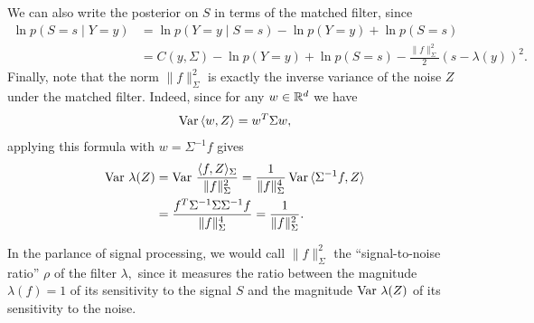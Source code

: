 We can also write the posterior on $S$ in terms of the matched filter, since
\begin{align}
	\ln p(S = s \mid Y = y)
	 & = \ln p(Y = y \mid S = s) - \ln p(Y = y) + \ln p(S = s) \nonumber \\
	& = C(y, \Sigma) - \ln p(Y = y) + \ln p(S = s) - \frac {\lVert f \rVert^2_\Sigma} 2 \left( s - \lambda(y) \right)^2.
\end{align}
Finally, note that the norm $\lVert f \rVert^2_\Sigma$ is exactly the inverse variance of the noise $Z$ under the matched filter. Indeed, since for any $w \in \mathbb{R}^d$ we have
$$
\operatorname{Var} \, \langle w, Z \rangle = w^T \Sigma w,
$$
applying this formula with $w = \Sigma^{-1} f$ gives
\begin{align*}
\operatorname{Var}\, \lambda(Z) & = \operatorname{Var} \, \frac{\langle f, Z \rangle_\Sigma}{\lVert f \rVert^2_\Sigma}  = \frac{1}{\lVert f \rVert_\Sigma^4} \operatorname{Var} \, \langle \Sigma^{-1} f, Z \rangle \\
& = \frac{f^T \Sigma^{-1} \Sigma \Sigma^{-1} f}{\lVert f \rVert_\Sigma^4} = \frac{1}{\lVert f \rVert^2_\Sigma}.
\end{align*}

In the parlance of signal processing, we would call $\lVert f \rVert^2_\Sigma$ the ``signal-to-noise ratio'' $\rho$ of the filter $\lambda,$ since it measures the ratio between the magnitude $\lambda(f) = 1$ of its sensitivity to the signal $S$ and the magnitude $\operatorname{Var}\, \lambda(Z)$ of its sensitivity to the noise.
